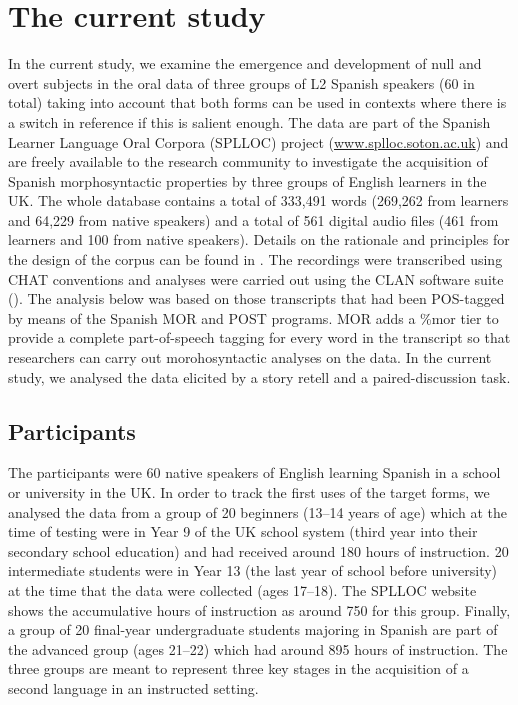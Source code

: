 \documentclass[output=paper]{langscibook}
\begin{document}
\section{The current study}\largerpage

In the current study, we examine the emergence and development of null and overt subjects in the oral data of three groups of L2 Spanish speakers (60 in total) taking into account that both forms can be used in contexts where there is a switch in reference if this is salient enough. The data are part of the Spanish Learner Language Oral Corpora (SPLLOC) project (\url{www.splloc.soton.ac.uk}) and are freely available to the research community to investigate the acquisition of Spanish morphosyntactic properties by three groups of English learners in the UK. The whole database contains a total of 333,491 words (269,262 from learners and 64,229 from native speakers) and a total of 561 digital audio files (461 from learners and 100 from native speakers). Details on the rationale and principles for the design of the corpus can be found in \citet{MitchellEtAl2008}. The recordings were transcribed using CHAT conventions and analyses were carried out using the CLAN software suite (\citealt{MacWhinney1991,MacWhinney2000}). The analysis below was based on those transcripts that had been POS-tagged by means of the Spanish MOR and POST programs. MOR adds a \%mor tier to provide a complete part-of-speech tagging for every word in the transcript so that researchers can carry out morohosyntactic analyses on the data. In the current study, we analysed the data elicited by a story retell and a paired-discussion task.

\subsection{Participants}

The participants were 60 native speakers of English learning Spanish in a school or university in the UK. In order to track the first uses of the target forms, we analysed the data from a group of 20 beginners (13--14 years of age) which at the time of testing were in Year 9 of the UK school system (third year into their secondary school education) and had received around 180 hours of instruction. 20 intermediate students were in Year 13 (the last year of school before university) at the time that the data were collected (ages 17--18). The SPLLOC website shows the accumulative hours of instruction as around 750 for this group. Finally, a group of 20 final-year undergraduate students majoring in Spanish are part of the advanced group (ages 21--22) which had around 895 hours of instruction. The three groups are meant to represent three key stages in the acquisition of a second language in an instructed setting.
\end{document}
